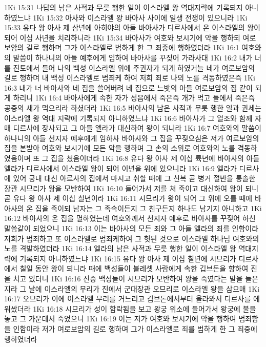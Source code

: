 1Ki 15:31  나답의 남은 사적과 무릇 행한 일이 이스라엘 왕 역대지략에 기록되지 아니하였느냐
1Ki 15:32  아사와 이스라엘 왕 바아사 사이에 일생 전쟁이 있으니라
1Ki 15:33  유다 왕 아사 제 삼년에 아히야의 아들 바아사가 디르사에서 온 이스라엘의 왕이 되어 이십 사년을 치리하니라
1Ki 15:34  바아사가 여호와 보시기에 악을 행하되 여로보암의 길로 행하며 그가 이스라엘로 범하게 한 그 죄중에 행하였더라
1Ki 16:1  여호와의 말씀이 하나니의 아들 예후에게 임하여 바아사를 꾸짖어 가라사대
1Ki 16:2  내가 너를 진토에서 들어 나의 백성 이스라엘 위에 주권자가 되게 하였거늘 네가 여로보암의 길로 행하며 내 백성 이스라엘로 범죄케 하여 저희 죄로 나의 노를 격동하였은즉
1Ki 16:3  내가 너 바아사와 네 집을 쓸어버려 네 집으로 느밧의 아들 여로보암의 집 같이 되게 하리니
1Ki 16:4  바아사에게 속한 자가 성읍에서 죽은즉 개가 먹고 들에서 죽은즉 공중의 새가 먹으리라 하셨더라
1Ki 16:5  바아사의 남은 사적과 무릇 행한 일과 권세는 이스라엘 왕 역대 지략에 기록되지 아니하였느냐
1Ki 16:6  바아사가 그 열조와 함께 자매 디르사에 장사되고 그 아들 엘라가 대신하여 왕이 되니라
1Ki 16:7  여호와의 말씀이 하나니의 아들 선지자 예후에게 임하사 바아사와 그 집을 꾸짖으심은 저가 여로보암의 집을 본받아 여호와 보시기에 모든 악을 행하며 그 손의 소위로 여호와의 노를 격동하였음이며 또 그 집을 쳤음이더라
1Ki 16:8  유다 왕 아사 제 이십 륙년에 바아사의 아들 엘라가 디르사에서 이스라엘 왕이 되어 이년을 위에 있으니라
1Ki 16:9  엘라가 디르사에 있어 궁내 대신 아르사의 집에서 마시고 취할 때에 그 신복 곧 병거 절반을 통솔한 장관 시므리가 왕을 모반하여
1Ki 16:10  들어가서 저를 쳐 죽이고 대신하여 왕이 되니 곧 유다 왕 아사 제 이십 칠년이라
1Ki 16:11  시므리가 왕이 되어 그 위에 오를 때에 바아사의 온 집을 죽이되 남자는 그 족속이든지 그 친구든지 하나도 남기지 아니하고
1Ki 16:12  바아사의 온 집을 멸하였는데 여호와께서 선지자 예후로 바아사를 꾸짖어 하신 말씀같이 되었으니
1Ki 16:13  이는 바아사의 모든 죄와 그 아들 엘라의 죄를 인함이라 저희가 범죄하고 또 이스라엘로 범죄케하여 그 헛된 것으로 이스라엘 하나님 여호와의 노를 격발하였더라
1Ki 16:14  엘라의 남은 사적과 무릇 행한 일이 이스라엘 왕 역대지략에 기록되지 아니하였느냐
1Ki 16:15  유다 왕 아사 제 이십 칠년에 시므리가 디르사에서 칠일 동안 왕이 되니라 때에 백성들이 블레셋 사람에게 속한 깁브돈을 향하여 진을 치고 있더니
1Ki 16:16  진중 백성들이 시므리가 모반하여 왕을 죽였다는 말을 들은지라 그 날에 이스라엘의 무리가 진에서 군대장관 오므리로 이스라엘 왕을 삼으매
1Ki 16:17  오므리가 이에 이스라엘 무리를 거느리고 깁브돈에서부터 올라와서 디르사를 에워쌌더라
1Ki 16:18  시므리가 성이 함락됨을 보고 왕궁 위소에 들어가서 왕궁에 불을 놓고 그 가운데서 죽었으니
1Ki 16:19  이는 저가 여호와 보시기에 악을 행하여 범죄함을 인함이라 저가 여로보암의 길로 행하며 그가 이스라엘로 죄를 범하게 한 그 죄중에 행하였더라

